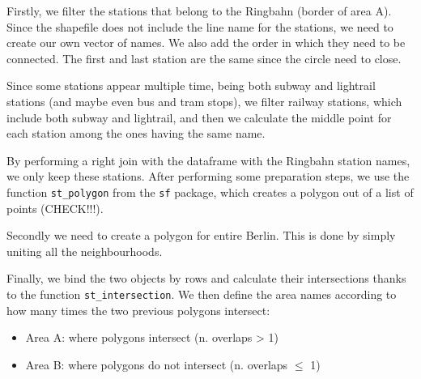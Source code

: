 Firstly, we filter the stations that belong to the Ringbahn (border of area A). Since the shapefile does not include the line name for the stations, we need to create our own vector of names. We also add the order in which they need to be connected. The first and last station are the same since the circle need to close.



Since some stations appear multiple time, being both subway and lightrail stations (and maybe even bus and tram stops), we filter railway stations, which include both subway and lightrail, and then we calculate the middle point for each station among the ones having the same name.



By performing a right join with the dataframe with the Ringbahn station names, we only keep these stations. After performing some preparation steps, we use the function \texttt{st\_polygon} from the \texttt{sf} package, which creates a polygon out of a list of points (CHECK!!!).



Secondly we need to create a polygon for entire Berlin. This is done by simply uniting all the neighbourhoods.



Finally, we bind the two objects by rows and calculate their intersections thanks to the function \texttt{st\_intersection}. We then define the area names according to how many times the two previous polygons intersect:
	\begin{itemize}
    		\item Area A: where polygons intersect (n. overlaps > 1)
    		\item Area B: where polygons do not intersect (n. overlaps $\leq$ 1)
    \end{itemize}

